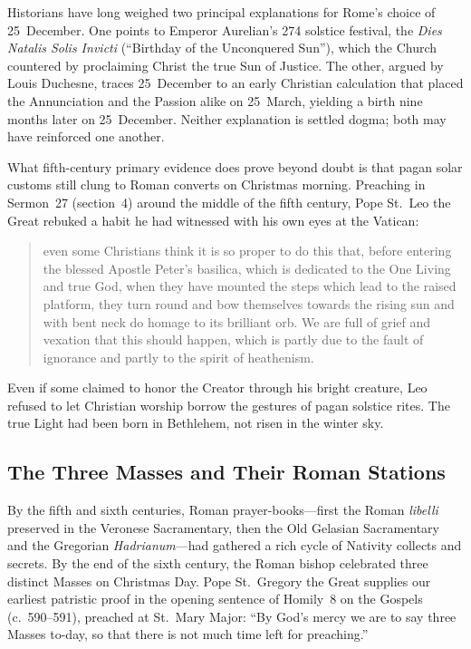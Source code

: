 Historians have long weighed two principal explanations for Rome's choice of
25~December. One points to Emperor Aurelian's 274 solstice festival, the
\textit{Dies Natalis Solis Invicti} (``Birthday of the Unconquered Sun''), which
the Church countered by proclaiming Christ the true Sun of Justice. The other,
argued by Louis Duchesne, traces 25~December to an early Christian calculation
that placed the Annunciation and the Passion alike on 25~March, yielding a birth
nine months later on 25~December. Neither explanation is settled dogma; both may
have reinforced one another.

What fifth-century primary evidence does prove beyond doubt is that pagan solar
customs still clung to Roman converts on Christmas morning. Preaching in
Sermon~27 (section~4) around the middle of the fifth century, Pope St.~Leo the
Great rebuked a habit he had witnessed with his own eyes at the Vatican:

\begin{quote}
even some Christians think it is so proper to do this that, before entering the
blessed Apostle Peter's basilica, which is dedicated to the One Living and true
God, when they have mounted the steps which lead to the raised platform, they
turn round and bow themselves towards the rising sun and with bent neck do
homage to its brilliant orb. We are full of grief and vexation that this should
happen, which is partly due to the fault of ignorance and partly to the spirit
of heathenism.
\end{quote}

Even if some claimed to honor the Creator through his bright creature, Leo
refused to let Christian worship borrow the gestures of pagan solstice rites.
The true Light had been born in Bethlehem, not risen in the winter sky.

\subsection{The Three Masses and Their Roman Stations}

By the fifth and sixth centuries, Roman prayer-books---first the Roman
\textit{libelli} preserved in the Veronese Sacramentary, then the Old Gelasian
Sacramentary and the Gregorian \textit{Hadrianum}---had gathered a rich cycle of
Nativity collects and secrets. By the end of the sixth century, the Roman bishop
celebrated three distinct Masses on Christmas Day. Pope St.~Gregory the Great
supplies our earliest patristic proof in the opening sentence of Homily~8 on the
Gospels (c.~590--591), preached at St.~Mary Major: ``By God's mercy we are to
say three Masses to-day, so that there is not much time left for preaching.''


